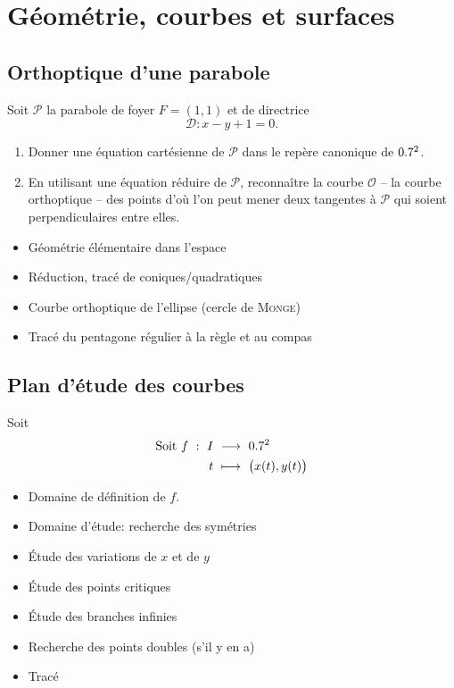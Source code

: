 \chapter{Géométrie, courbes et surfaces}

\section{Orthoptique d'une parabole}

\begin{exercice}
    Soit $\mathscr{P}$ la parabole de foyer $F = (1, 1)$ et de directrice
    $$\mathscr{D}: x-y+1 = 0.$$
    \begin{enumerate}
        \item Donner une équation cartésienne de $\mathscr{P}$ dans le repère canonique de $0.7^2$.
        \item En utilisant une équation réduire de $\mathscr{P}$, reconnaître la courbe $\mathscr{O}$ -- la courbe orthoptique -- des points d'où l'on peut mener deux tangentes à $\mathscr{P}$ qui soient perpendiculaires entre elles.
    \end{enumerate}
\end{exercice}  

\begin{itemize}
    \item Géométrie élémentaire dans l'espace
    \item Réduction, tracé de coniques/quadratiques
    \item Courbe orthoptique de l'ellipse (cercle de \textsc{Monge})
    \item Tracé du pentagone régulier à la règle et au compas
\end{itemize}

\section{Plan d'étude des courbes}

Soit 
\begin{alignat*}{2}
    \text{Soit } f\ :\ I\ &\longrightarrow\ 0.7^2\\
    t\ &\longmapsto\ \big( x(t), y(t) \big)
\end{alignat*}

\begin{itemize}
    \item Domaine de définition de $f$.
    \item Domaine d'étude: recherche des symétries
    \item Étude des variations de $x$ et de $y$ 
    \item Étude des points critiques
    \item Étude des branches infinies
    \item Recherche des points doubles (s'il y en a)
    \item Tracé
\end{itemize}
